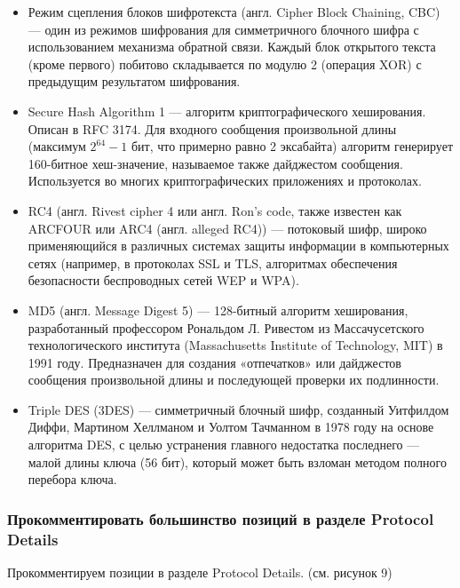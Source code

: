 \documentclass[11pt, a4paper]{article}		%
\begin{document}
\begin{itemize}
\item Режим сцепления блоков шифротекста (англ. Cipher Block Chaining, CBC) — один из режимов шифрования для симметричного блочного шифра с использованием механизма обратной связи. Каждый блок открытого текста (кроме первого) побитово складывается по модулю 2 (операция XOR) с предыдущим результатом шифрования.

\item Secure Hash Algorithm 1 — алгоритм криптографического хеширования. Описан в RFC 3174. Для входного сообщения произвольной длины (максимум $2^{64}-1$ бит, что примерно равно 2 эксабайта) алгоритм генерирует 160-битное хеш-значение, называемое также дайджестом сообщения. Используется во многих криптографических приложениях и протоколах. 

\item RC4 (англ. Rivest cipher 4 или англ. Ron’s code, также известен как ARCFOUR или ARC4 (англ. alleged RC4)) — потоковый шифр, широко применяющийся в различных системах защиты информации в компьютерных сетях (например, в протоколах SSL и TLS, алгоритмах обеспечения безопасности беспроводных сетей WEP и WPA).

\item MD5 (англ. Message Digest 5) — 128-битный алгоритм хеширования, разработанный профессором Рональдом Л. Ривестом из Массачусетского технологического института (Massachusetts Institute of Technology, MIT) в 1991 году. Предназначен для создания «отпечатков» или дайджестов сообщения произвольной длины и последующей проверки их подлинности.

\item Triple DES (3DES) — симметричный блочный шифр, созданный Уитфилдом Диффи, Мартином Хеллманом и Уолтом Тачманном в 1978 году на основе алгоритма DES, с целью устранения главного недостатка последнего — малой длины ключа (56 бит), который может быть взломан методом полного перебора ключа. 

\end{itemize}



\subsubsection{Прокомментировать большинство позиций в разделе Protocol Details}

Прокомментируем позиции в разделе Protocol Details. (см. рисунок 9)
\end{document}
